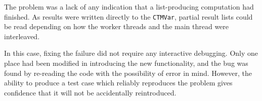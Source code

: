 The problem was a lack of any indication that a list-producing
computation had finished. As results were written directly to the
\verb|CTMVar|, partial result lists could be read depending on how the
worker threads and the main thread were interleaved.

In this case, fixing the failure did not require any interactive
debugging. Only one place had been modified in introducing the new
functionality, and the bug was found by re-reading the code with the
possibility of error in mind. However, the ability to produce a test
case which reliably reproduces the problem gives confidence that it
will not be accidentally reintroduced.

